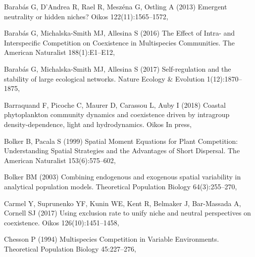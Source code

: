 \documentclass[a4paper,12pt]{article}
\begin{document}
\begin{thebibliography}{56}
Barab\'as G, D'Andrea R, Rael R, Mesz\'ena G, Ostling A (2013) Emergent
  neutrality or hidden niches? Oikos 122(11):1565--1572,

Barab\'as G, Michalska-Smith MJ, Allesina S (2016) The {Effect} of {Intra}- and
  {Interspecific} {Competition} on {Coexistence} in {Multispecies}
  {Communities}. The American Naturalist 188(1):E1--E12, 

Barab\'as G, Michalska-Smith MJ, Allesina S (2017) Self-regulation and the
  stability of large ecological networks. Nature Ecology \& Evolution
  1(12):1870--1875, 

Barraquand F, Picoche C, Maurer D, Carassou L, Auby I (2018) Coastal
  phytoplankton community dynamics and coexistence driven by intragroup
  density-dependence, light and hydrodynamics. Oikos In press,

Bolker B, Pacala S (1999) Spatial {Moment} {Equations} for {Plant}
  {Competition}: {Understanding} {Spatial} {Strategies} and the {Advantages} of
  {Short} {Dispersal}. The American Naturalist 153(6):575--602,

Bolker BM (2003) Combining endogenous and exogenous spatial variability in
  analytical population models. Theoretical Population Biology 64(3):255--270,

Carmel Y, Suprunenko YF, Kunin WE, Kent R, Belmaker J, Bar-Massada A, Cornell
  SJ (2017) Using exclusion rate to unify niche and neutral perspectives on
  coexistence. Oikos 126(10):1451--1458, 

Chesson P (1994) Multispecies {Competition} in {Variable} {Environments}.
  Theoretical Population Biology 45:227--276, 


\end{thebibliography}
\end{document}
